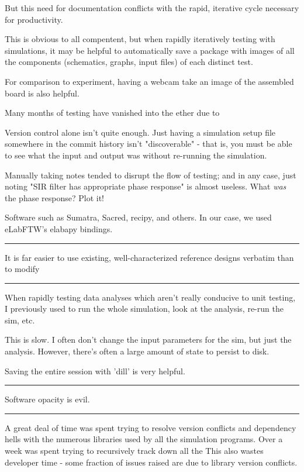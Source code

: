 \documentclass[paper.tex]{subfiles}
\begin{document}
But this need for documentation conflicts with the rapid, iterative cycle necessary for productivity.

This is obvious to all compentent, but when rapidly iteratively testing with simulations, it may be helpful to automatically save a package with images of all the components (schematics, graphs, input files) of each distinct test. 

For comparison to experiment, having a webcam take an image of the assembled board is also helpful. 

Many months of testing have vanished into the ether due to 

Version control alone isn't quite enough. Just having a simulation setup file somewhere in the commit history isn't "discoverable" - that is, you must be able to see what the input and output was without re-running the simulation. 

Manually taking notes tended to disrupt the flow of testing; and in any case, just noting "SIR filter has appropriate phase response" is almost useless. What {\it was} the phase response? Plot it!

Software such as Sumatra, Sacred, recipy, and others. In our case, we used eLabFTW's elabapy bindings.

\rule{\linewidth}{0.2pt}

It is far easier to use existing, well-characterized reference designs verbatim than to modify 

\rule{\linewidth}{0.2pt}

When rapidly testing data analyses which aren't really conducive to unit testing, I previously used to run the whole simulation, look at the analysis, re-run the sim, etc.

This is slow. I often don't change the input parameters for the sim, but just the analysis. However, there's often a large amount of state to persist to disk.

Saving the entire session with 'dill' is very helpful.

\rule{\linewidth}{0.2pt}

Software opacity is evil.

\rule{\linewidth}{0.2pt}

A great deal of time was spent trying to resolve version conflicts and dependency hells with the numerous libraries used by all the simulation programs. Over a week was spent trying to recursively track down all the This also wastes developer time - some fraction of issues raised are due to library version conflicts. 
\end{document}
